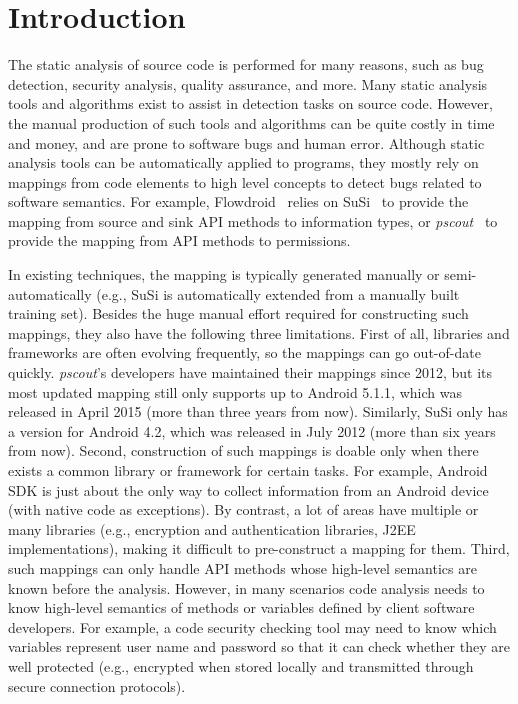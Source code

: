 \section{Introduction}

The static analysis of source code is performed for many reasons, such as bug detection, security analysis, quality assurance, and more. Many static analysis tools and algorithms exist to assist in detection tasks on source code. However, the manual production of such tools and algorithms can be quite costly in time and money, and are prone to software bugs and human error. Although static analysis tools can be automatically applied to programs, they mostly rely on mappings from code elements to high level concepts to detect bugs related to software semantics. For example, Flowdroid~\cite{arzt2014flowdroid} relies on SuSi~\cite{rasthofer2014machine} to provide the mapping from source and sink API methods to information types, or \textit{pscout}~\cite{au2012pscout} to provide the mapping from API methods to permissions. 


In existing techniques, the mapping is typically generated manually or semi-automatically (e.g., SuSi is automatically extended from a manually built training set). Besides the huge manual effort required for constructing such mappings, they also have the following three limitations. First of all, libraries and frameworks are often evolving frequently, so the mappings can go out-of-date quickly. \textit{pscout}'s developers have maintained their mappings since 2012, but its most updated mapping still only supports up to Android 5.1.1, which was released in April 2015 (more than three years from now). Similarly, SuSi only has a version for Android 4.2, which was released in July 2012 (more than six years from now). Second, construction of such mappings is doable only when there exists a common library or framework for certain tasks. For example,  Android SDK is just about the only way to collect information from an Android device (with native code as exceptions). By contrast, a lot of areas have multiple or many libraries (e.g., encryption and authentication libraries, J2EE implementations), making it difficult to pre-construct a mapping for them. Third, such mappings can only handle API methods whose high-level semantics are known before the analysis. However, in many scenarios code analysis needs to know high-level semantics of methods or variables defined by client software developers. For example, a code security checking tool may need to know which variables represent user name and password so that it can check whether they are well protected (e.g., encrypted when stored locally and transmitted through secure connection protocols).  

